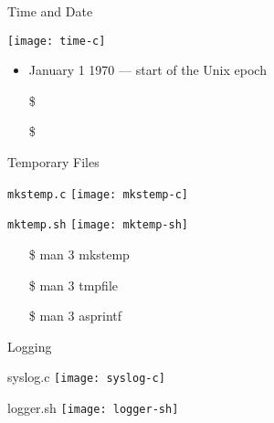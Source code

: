 \begin{frame}{Time and Date}
  \begin{center}
    \texttt{[image: time-c]}
  \end{center}
  \begin{itemize}
  \item January 1 1970 --- start of the Unix epoch
  \item[\$] 
  \item[\$] 
  \end{itemize}
\end{frame}

\begin{frame}{Temporary Files}
  \ttfamily
  \begin{minipage}[t]{.55\linewidth}
    \begin{block}{\texttt{mkstemp.c}}
      \texttt{[image: mkstemp-c]}
    \end{block}
  \end{minipage}\qquad
  \begin{minipage}[t]{.35\linewidth}
    \begin{block}{\texttt{mktemp.sh}}
      \texttt{[image: mktemp-sh]}
    \end{block}
    \begin{itemize}
    \item[\$] man 3 mkstemp
    \item[\$] man 3 tmpfile
    \item[\$] man 3 asprintf
    \end{itemize}
  \end{minipage}
\end{frame}

\begin{frame}{Logging}
  \begin{block}{\ttfamily syslog.c}
    \texttt{[image: syslog-c]}
  \end{block}
  \begin{block}{\ttfamily logger.sh}
    \texttt{[image: logger-sh]}
  \end{block}
\end{frame}

